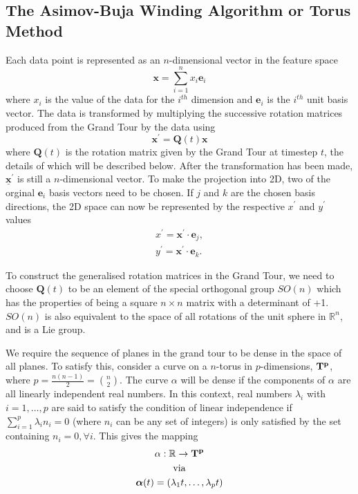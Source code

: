 \documentclass[a4paper,11pt,twoside]{article}
\begin{document}
\subsection{The Asimov-Buja Winding Algorithm or Torus Method}

Each data point is represented as an $n$-dimensional vector in the feature space
\begin{equation}
\bm{x}=\sum_{i=1}^n x_i \bm{e}_i 
\end{equation}
where $x_i$ is the value of the data for the $i^{th}$ dimension and $\bm{e}_i$ is the $i^{th}$ unit basis vector. The data is transformed by multiplying the successive rotation matrices produced from the Grand Tour by the data using
\begin{equation}
\bm{x}^\prime = \bm{Q}(t) \bm{x}
\end{equation}
where $\bm{Q}(t)$ is the rotation matrix given by the Grand Tour at timestep $t$, the details of which will be described below. After the transformation has been made, $\bm{\underline{x}}^\prime$ is still a $n$-dimensional vector. To make the projection into 2D, two of the orginal $\bm{e}_i$ basis vectors need to be chosen. If $j$ and $k$ are the chosen basis directions, the 2D space can now be represented by the respective $x^{\prime}$ and $y^{\prime}$ values
\begin{equation}
\begin{split}
x^{\prime}=\bm{x}^\prime\cdot\bm{e}_j, 
\\
y^{\prime}=\bm{x}^\prime\cdot\bm{e}_k.
\end{split}
\end{equation}

To construct the generalised rotation matrices in the Grand Tour, we need to choose $\bm{Q}(t)$ to be an element of the special orthogonal group $SO(n)$ which has the properties of being a square $n\times n$ matrix with a determinant of +1. $SO(n)$ is also equivalent to the space of all rotations of the unit sphere in $\mathbb{R}^n$, and is a Lie group.
\newline

We require the sequence of planes in the grand tour to be dense in the space of all planes. To satisfy this, consider a curve on a $n$-torus in $p$-dimensions, $\bf{T}^p$, where $p=\frac{n(n-1)}{2}={n \choose 2} $. The curve $\alpha$ will be dense if the components of $\alpha$ are all linearly independent real numbers. In this context, real numbers $\lambda_i$ with  $i=1,\dotsc,p$ are said to satisfy the condition of linear independence if $\sum_{i=1}^p \lambda_i n_i=0$ (where $n_i$ can be any set of integers) is only satisfied by the set containing $n_i=0, \forall i$. This gives the mapping
\begin{equation}
\begin{gathered}
\alpha: \mathbb R \rightarrow \bf{T}^p
\\
\text{via}
\\
\bm{\alpha}(t)=(\lambda_1 t,\dotsc, \lambda_p t)
\end{gathered}
\end{equation}
\end{document}
